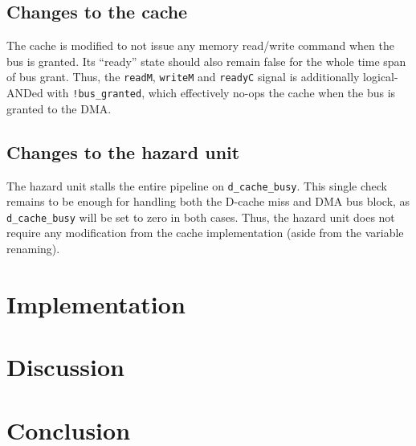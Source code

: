 \documentclass[12pt]{article}
\begin{document}
\subsection{Changes to the cache}
The cache is modified to not issue any memory read/write command when
the bus is granted.  Its ``ready'' state should also remain false for
the whole time span of bus grant.  Thus, the \verb|readM|,
\verb|writeM| and \verb|readyC| signal is additionally logical-ANDed
with \verb|!bus_granted|, which effectively no-ops the cache when the
bus is granted to the DMA.

\subsection{Changes to the hazard unit}
The hazard unit stalls the entire pipeline on \verb|d_cache_busy|.
This single check remains to be enough for handling both the D-cache
miss and DMA bus block, as \verb|d_cache_busy| will be set to zero in
both cases.  Thus, the hazard unit does not require any modification
from the cache implementation (aside from the variable renaming).

\section{Implementation}
\section{Discussion}
\section{Conclusion}
\end{document}
